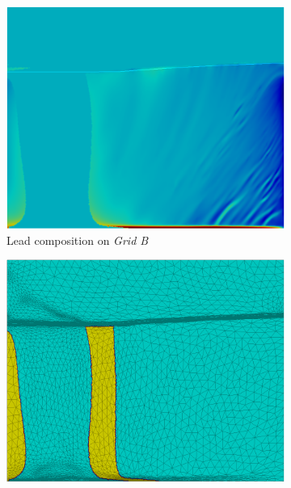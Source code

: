 \begin{figure}[htbp]
\begin{subfigure}[t]{0.15\textwidth}
  \end{subfigure}
  \begin{subfigure}[t]{0.4\textwidth}
    \centering
  \includegraphics[width=\textwidth]{Chapter5/Graphics/2d/1700s_compobis.png}
  \caption{Lead composition on \emph{Grid B}}
    \label{fig:1700s_compobis}
  \end{subfigure}
   \vspace{5mm}
  \begin{subfigure}[t]{0.4\textwidth}
    \centering
  \includegraphics[width=\textwidth]{Chapter5/Graphics/2d/1700s_unmask.png}

\end{subfigure}
\end{figure}
